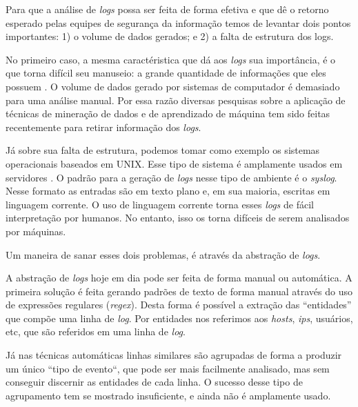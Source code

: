 \documentclass[
	12pt,				%
	openright,			%
	twoside,			%
	a4paper,			%
	english,			%
	spanish,			%
	brazil,				%
	]{abntex2}
\begin{document}
Para que a análise de \emph{logs} possa ser feita de forma efetiva e que dê o retorno esperado pelas equipes de segurança da informação temos de levantar dois pontos importantes: 1) o volume de dados gerados; e 2) a falta de estrutura dos logs.

No primeiro caso, a mesma caractéristica que dá aos \emph{logs} sua importância, é o que torna difícil seu manuseio: a grande quantidade de informações que eles possuem \cite{brugger2001data,miranskyy2016data,nagappan2010abstracting,vaarandi2003data}. O volume de dados gerado por sistemas de computador é demasiado para uma análise manual. Por essa razão diversas pesquisas sobre a aplicação de técnicas de mineração de dados e de aprendizado de máquina tem sido feitas recentemente para retirar informação dos \emph{logs}.

Já sobre sua falta de estrutura, podemos tomar como exemplo os sistemas operacionais baseados em UNIX\texttrademark. Esse tipo de sistema é amplamente usados em servidores \cite{w3techs-osusage}. O padrão para a geração de \emph{logs} nesse tipo de ambiente é o \emph{syslog}. Nesse formato as entradas são em texto plano e, em sua maioria, escritas em linguagem corrente. O uso de linguagem corrente torna esses \emph{logs} de fácil interpretação por humanos. No entanto, isso os torna difíceis de serem analisados por máquinas. 

Um maneira de sanar esses dois problemas, é através da abstração de \emph{logs}.

A abstração de \emph{logs} hoje em dia pode ser feita de forma manual ou automática. A primeira solução é feita gerando padrões de texto de forma manual através do uso de expressões regulares (\emph{regex}). Desta forma é possível a extração das ``entidades'' que compõe uma linha de \emph{log}. Por entidades nos referimos aos \emph{hosts}, \emph{ips}, usuários, etc, que são referidos em uma linha de \emph{log}.

Já nas técnicas automáticas linhas similares são agrupadas de forma a produzir um único ``tipo de evento``, que pode ser mais facilmente analisado, mas sem conseguir discernir as entidades de cada linha. O sucesso desse tipo de agrupamento tem se mostrado insuficiente, e ainda não é amplamente usado.

\end{document}
